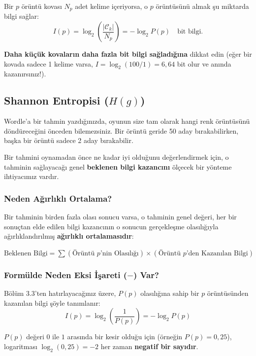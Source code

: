 \documentclass[11pt,a4paper]{article}
\begin{document}
Bir $p$ örüntü kovası $N_p$ adet kelime içeriyorsa, o $p$ örüntüsünü almak şu miktarda bilgi sağlar:
\begin{equation}
I(p) = \log_2 \left( \frac{|\mathcal{C}_k|}{N_p} \right) = -\log_2 P(p) \quad \text{bit bilgi.}
\end{equation}

\textbf{Daha küçük kovaların daha fazla bit bilgi sağladığına} dikkat edin (eğer bir kovada sadece 1 kelime varsa, $I = \log_2(100/1) = 6,64$ bit olur ve anında kazanırsınız!).

\subsection{\texorpdfstring{Shannon Entropisi ($H(g)$)}{Shannon Entropisi}}
Wordle'a bir tahmin yazdığınızda, oyunun size tam olarak hangi renk örüntüsünü döndüreceğini önceden bilemezsiniz. Bir örüntü geride 50 aday bırakabilirken, başka bir örüntü sadece 2 aday bırakabilir.

Bir tahmini oynamadan önce ne kadar iyi olduğunu değerlendirmek için, o tahminin sağlayacağı genel \textbf{beklenen bilgi kazancını} ölçecek bir yönteme ihtiyacımız vardır.

\subsubsection*{Neden Ağırlıklı Ortalama?}
Bir tahminin birden fazla olası sonucu varsa, o tahminin genel değeri, her bir sonuçtan elde edilen bilgi kazancının o sonucun gerçekleşme olasılığıyla ağırlıklandırılmış \textbf{ağırlıklı ortalamasıdır}:
\begin{center}
$\text{Beklenen Bilgi} = \sum (\text{Örüntü } p\text{'nin Olasılığı}) \times (\text{Örüntü } p\text{'den Kazanılan Bilgi})$
\end{center}

\subsubsection*{Formülde Neden Eksi İşareti ($-$) Var?}
Bölüm 3.3'ten hatırlayacağınız üzere, $P(p)$ olasılığına sahip bir $p$ örüntüsünden kazanılan bilgi şöyle tanımlanır:
\begin{equation}
I(p) = \log_2 \left( \frac{1}{P(p)} \right) = -\log_2 P(p)
\end{equation}

$P(p)$ değeri $0$ ile $1$ arasında bir kesir olduğu için (örneğin $P(p) = 0,25$), logaritması $\log_2(0,25) = -2$ her zaman \textbf{negatif bir sayıdır}.
\end{document}
